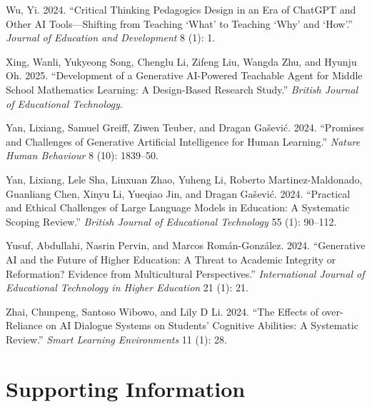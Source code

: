 \documentclass[
  11pt,
]{article}
\newlength{\cslhangindent}
\newenvironment{CSLReferences}[2] %
 {\begin{list}{}{%
  \setlength{\itemindent}{0pt}
  \setlength{\leftmargin}{0pt}
  \setlength{\parsep}{0pt}
  \ifodd #1
   \setlength{\leftmargin}{\cslhangindent}
   \setlength{\itemindent}{-1\cslhangindent}
  \fi
  \setlength{\itemsep}{#2\baselineskip}}}
 {\end{list}}
\begin{document}
\begin{CSLReferences}{1}{0}
Wu, Yi. 2024. {``Critical Thinking Pedagogics Design in an Era of ChatGPT and Other AI Tools---Shifting from Teaching {`What'} to Teaching {`Why'} and {`How'}.''} \emph{Journal of Education and Development} 8 (1): 1.

Xing, Wanli, Yukyeong Song, Chenglu Li, Zifeng Liu, Wangda Zhu, and Hyunju Oh. 2025. {``Development of a Generative AI-Powered Teachable Agent for Middle School Mathematics Learning: A Design-Based Research Study.''} \emph{British Journal of Educational Technology}.

Yan, Lixiang, Samuel Greiff, Ziwen Teuber, and Dragan Gašević. 2024. {``Promises and Challenges of Generative Artificial Intelligence for Human Learning.''} \emph{Nature Human Behaviour} 8 (10): 1839--50.

Yan, Lixiang, Lele Sha, Linxuan Zhao, Yuheng Li, Roberto Martinez-Maldonado, Guanliang Chen, Xinyu Li, Yueqiao Jin, and Dragan Gašević. 2024. {``Practical and Ethical Challenges of Large Language Models in Education: A Systematic Scoping Review.''} \emph{British Journal of Educational Technology} 55 (1): 90--112.

Yusuf, Abdullahi, Nasrin Pervin, and Marcos Román-González. 2024. {``Generative AI and the Future of Higher Education: A Threat to Academic Integrity or Reformation? Evidence from Multicultural Perspectives.''} \emph{International Journal of Educational Technology in Higher Education} 21 (1): 21.

Zhai, Chunpeng, Santoso Wibowo, and Lily D Li. 2024. {``The Effects of over-Reliance on AI Dialogue Systems on Students' Cognitive Abilities: A Systematic Review.''} \emph{Smart Learning Environments} 11 (1): 28.

\end{CSLReferences}

\clearpage
\processdelayedfloats
\clearpage
\appendix
\setcounter{table}{0}
\setcounter{figure}{0}
\renewcommand{\thetable}{A\arabic{table}}
\renewcommand{\thefigure}{A\arabic{figure}}

\section{Supporting Information}\label{supporting-information}
\end{document}
